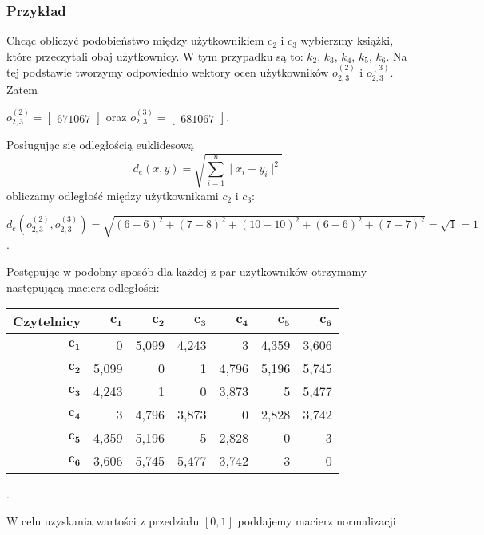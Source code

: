 \documentclass[12pt,a4paper]{report}
\begin{document}
\subsubsection{Przykład}
Chcąc obliczyć podobieństwo między użytkownikiem $c_2$ i $c_3$ wybierzmy książki, które przeczytali obaj użytkownicy. W tym przypadku są to: $k_2$, $k_3$, $k_4$, $k_5$, $k_6$. Na tej podstawie tworzymy odpowiednio wektory ocen użytkowników $o_{2,3} ^{(2)}$ i $o_{2,3}^{(3)}$. 
Zatem
\begin{center}
$o_{2,3} ^{(2)}= \left[
        \begin{array}{c}
         6 
         7 
         10 
         6 
         7
         \end{array}
      \right]$ oraz $o_{2,3}^{(3)} = \left[
        \begin{array}{c}
         6 
         8 
         10 
         6 
         7
         \end{array}
      \right]$.
\end{center}
Posługując się odległością euklidesową
$$d_{e}(x,y) = \sqrt{\sum_{i=1}^n \mid x_{i} - y_{i} \mid ^2 }$$
obliczamy odległość między użytkownikami $c_2$ i $c_3$: 
\begin{center}
$d_{e}(o_{2,3}^{(2)},o_{2,3}^{(3)}) = \sqrt{(6-6)^2 + (7-8)^2 + (10-10)^2 + (6-6)^2 + (7-7)^2} = \sqrt{1} = 1$.
\end{center}
Postępując w podobny sposób dla każdej z par użytkowników otrzymamy następującą macierz odległości:
\begin{center}
\begin{tabular}{|r|r|r|r|r|r|r|} \hline
\textbf{Czytelnicy} & $\mathbf{c_1}$ & $\mathbf{c_2}$ & $\mathbf{c_3}$ & $\mathbf{c_4}$ & $\mathbf{c_5}$ & $\mathbf{c_6}$ \\
\hline
$\mathbf{c_1}$ & 0 & 5,099 & 4,243 & 3 & 4,359 & 3,606 \\
\hline
$\mathbf{c_2}$ & 5,099 & 0 & 1 & 4,796 & 5,196 & 5,745 \\
\hline
$\mathbf{c_3}$ & 4,243 & 1 & 0 & 3,873 & 5 & 5,477 \\
\hline
$\mathbf{c_4}$ & 3 & 4,796 & 3,873 & 0 & 2,828 & 3,742  \\
\hline 
$\mathbf{c_5}$ & 4,359 & 5,196 & 5 & 2,828 & 0 & 3 \\
\hline 
$\mathbf{c_6}$ & 3,606 & 5,745 & 5,477 & 3,742 & 3 & 0  \\
\hline 
\end{tabular}.
\end{center}
W celu uzyskania wartości z przedziału $[0,1]$ poddajemy macierz normalizacji 
\end{document}
